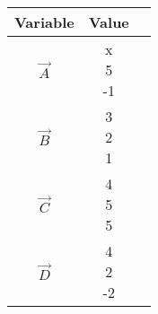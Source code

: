 \begin{center}
    \begin{tabular}{|c|c|c|} 
        \hline
            \textbf{Variable}  & \textbf{Value} \\ 
        \hline
            $\vec{A}$  & \myvec{x\\5\\-1} \\ 
        \hline
            $\vec{B}$  & \myvec{3\\2\\1}\\ 
        \hline
            $\vec{C}$  &   \myvec{4\\5\\5}   \\
        \hline
           $\vec{D}$    & \myvec{4\\2\\-2} \\
        \hline
    \end{tabular}
\end{center}  
